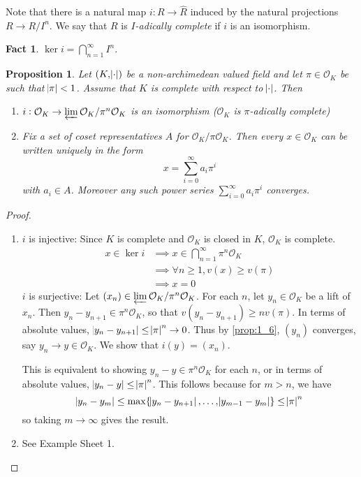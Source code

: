 \documentclass[11pt]{article}
\theoremstyle{definition}
\newtheorem*{fact}{Fact}
\theoremstyle{plain}
\newtheorem{proposition}[definition]{Proposition}
\theoremstyle{remark}
\newcommand{\cO}{\mathcal{O}}
\begin{document}
Note that there is a natural map $i : R \to \widehat{R}$ induced by the natural projections $R \to R/I^n$. We say that $R$ is \emph{$I$-adically complete} if $i$ is an isomorphism.

\begin{fact}
    $\ker{i} = \bigcap_{n=1}^\infty I^n$.
\end{fact}

\begin{proposition}\label{prop:3_5}
    Let $(K, \abs{\cdot})$ be a non-archimedean valued field and let $\pi \in \cO_K$ be such that $\abs{\pi} < 1$. Assume that $K$ is complete with respect to $\abs{\cdot}$. Then
    \begin{enumerate}
        \item $i : \cO_K \to \varprojlim \cO_K / \pi^n \cO_K$ is an isomorphism ($\cO_K$ is $\pi$-adically complete)
        \item Fix a set of coset representatives $A$ for $\cO_K / \pi \cO_K$. Then every $x \in \cO_K$ can be written uniquely in the form
            \begin{equation*}
                x = \sum_{i=0}^\infty a_i \pi^i
            \end{equation*}
            with $a_i \in A$.
            Moreover any such power series $\sum_{i=0}^\infty a_i \pi^i$ converges.
    \end{enumerate}
\end{proposition}
\begin{proof}\phantom{}
    \begin{enumerate}
        \item $i$ is injective: Since $K$ is complete and $\cO_K$ is closed in $K$, $\cO_K$ is complete.
            \begin{align*}
                x \in \ker i
                &\implies x \in \bigcap_{n=1}^\infty \pi^n \cO_K\\
                &\implies \forall n \ge 1, v(x) \ge v(\pi)\\
                &\implies x = 0
            \end{align*}
            $i$ is surjective: Let $(x_n) \in \varprojlim \cO_K / \pi^n \cO_K$. For each $n$, let $y_n \in \cO_K$ be a lift of $x_n$. Then $y_n - y_{n+1} \in \pi^n \cO_K$, so that $v(y_n - y_{n+1}) \ge n v(\pi)$. In terms of absolute values, $\abs{y_n - y_{n+1}} \le \abs{\pi}^n \to 0$. Thus by \autoref{prop:1_6}, $(y_n)$ converges, say $y_n \to y \in \cO_K$. We show that $i(y) = (x_n)$.

            This is equivalent to showing $y_n - y \in \pi^n \cO_K$ for each $n$, or in terms of absolute values, $\abs{y_n - y} \le \abs{\pi}^n$. This follows because for $m > n$, we have
            \begin{equation*}
                \abs{y_n - y_m} \le \max\{\abs{y_n - y_{n+1}}, \ldots, \abs{y_{m-1} - y_m} \} \le \abs{\pi}^n
            \end{equation*}
            so taking $m \to \infty$ gives the result.

        \item See Example Sheet 1. \qedhere
    \end{enumerate}
\end{proof}
\end{document}
